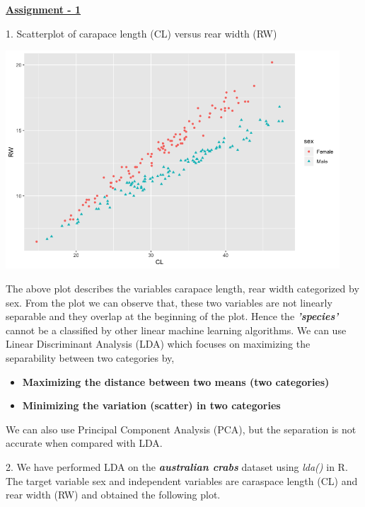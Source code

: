 \documentclass[a4paper,10pt]{article}
\begin{document}
\textbf{\underline{Assignment - 1}} \par
1. Scatterplot of carapace length (CL) versus rear width (RW) 
\begin{center}
	\includegraphics[width=125mm,scale=0.10]{CL_RW_Plot.png} 
\end{center} \par
The above plot describes the variables carapace length, rear width categorized by sex. From the plot we can observe
that, these two variables are not linearly separable and they overlap at the beginning of the plot.
Hence the \textit{\textbf{'species'}} cannot be a classified by other linear machine learning algorithms. We can use
Linear Discriminant Analysis (LDA) which focuses on maximizing the separability between two categories by, \par
\begin{center}
    \begin{itemize}
        \item \textbf{Maximizing the distance between two means (two categories)}
        \item \textbf{Minimizing the variation (scatter) in two categories}
    \end{itemize} \par
\end{center}
We can also use Principal Component Analysis (PCA), but the separation is not accurate when compared with LDA. \par
\vspace{0.5cm}
2. We have performed LDA on the \textit{\textbf{australian crabs}} dataset using \textit{lda()} in R. The target variable
sex and independent variables are caraspace length (CL) and rear width (RW) and obtained the following plot.
\end{document}
